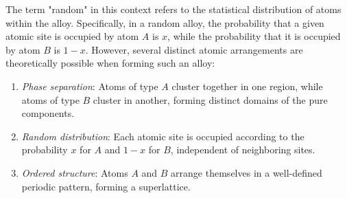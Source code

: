 The term "random" in this context refers to the statistical distribution of atoms within the alloy. Specifically, in a random alloy, the probability that a given atomic site is occupied by atom \( A \) is \( x \), while the probability that it is occupied by atom \( B \) is \( 1 - x \). However, several distinct atomic arrangements are theoretically possible when forming such an alloy:
\begin{enumerate}
	\item \textit{Phase separation}: Atoms of type \( A \) cluster together in one region, while atoms of type \( B \) cluster in another, forming distinct domains of the pure components.
	\item \textit{Random distribution}: Each atomic site is occupied according to the probability \( x \) for \( A \) and \( 1 - x \) for \( B \), independent of neighboring sites.
	\item \textit{Ordered structure}: Atoms \( A \) and \( B \) arrange themselves in a well-defined periodic pattern, forming a superlattice.
\end{enumerate}
